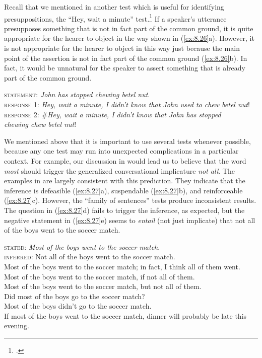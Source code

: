 Recall that we mentioned in  another test which is useful for identifying presuppositions, the “Hey, wait a minute” test.\footnote{.} If a speaker’s utterance presupposes something that is not in fact part of the common ground, it is quite appropriate for the hearer to object in the way shown in (\ref{ex:8.26}a). However, it is not appropriate for the hearer to object in this way just because the main point of the assertion is not in fact part of the common ground (\ref{ex:8.26}b). In fact, it would be unnatural for the speaker to assert something that is already part of the common ground.


\begin{stylepoints} \label{ex:8.26}
\textsc{statement}: \textit{John has stopped chewing betel nut}.\\
\ea \textsc{response 1}: \textit{Hey, wait a minute, I didn’t know that John used to chew betel nut}!\\
\ex \textsc{response 2}: \#\textit{Hey, wait a minute, I didn’t know that John has stopped\\
  chewing chew betel nut}!
                       \z
\end{stylepoints}


We mentioned above that it is important to use several tests whenever possible, because any one test may run into unexpected complications in a particular context. For example, our discussion in  would lead us to believe that the word \textit{most} should trigger the generalized conversational implicature \textit{not all}. The examples in  are largely consistent with this prediction. They indicate that the inference is defeasible (\ref{ex:8.27}a), suspendable (\ref{ex:8.27}b), and reinforceable (\ref{ex:8.27}c). However, the “family of sentences” tests produce inconsistent results. The question in (\ref{ex:8.27}d) fails to trigger the inference, as expected, but the negative statement in (\ref{ex:8.27}e) seems to \textit{entail} (not just implicate) that not all of the boys went to the soccer match.


\begin{stylepoints} \label{ex:8.27}
\textsc{stated}: \textit{Most of the boys went to the soccer match}.\\
\textsc{inferred}: Not all of the boys went to the soccer match.\\
\ea Most of the boys went to the soccer match; in fact, I think all of them went.\\
\ex Most of the boys went to the soccer match, if not all of them.\\
\ex Most of the boys went to the soccer match, but not all of them.\\
\ex Did most of the boys go to the soccer match?\\
\ex Most of the boys didn’t go to the soccer match.\\
\ex If most of the boys went to the soccer match, dinner will probably be late this evening.
                       \z
\end{stylepoints}


